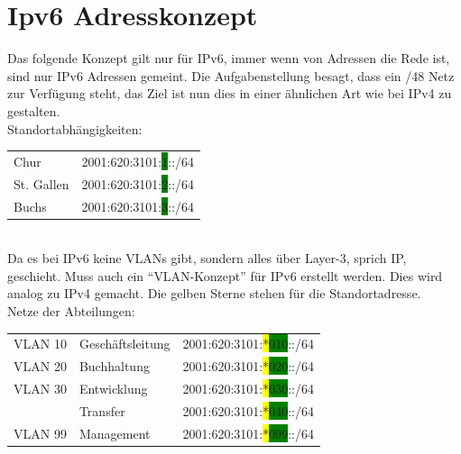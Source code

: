 \documentclass[11pt,a4paper]{scrreprt}
\begin{document}
\section{Ipv6 Adresskonzept} \label{ipv6}
Das folgende Konzept gilt nur für IPv6, immer wenn von Adressen die Rede ist, sind nur IPv6 Adressen gemeint.
Die Aufgabenstellung besagt, dass ein /48 Netz zur Verfügung steht, das Ziel ist nun dies in einer ähnlichen Art wie bei IPv4 zu gestalten. \\
\newline
Standortabhängigkeiten:\\ 
\newline
\hspace*{1cm} 
\begin{tabular}{ll}
    Chur & 2001:620:3101:\colorbox{green}{1}::/64\\
    St. Gallen & 2001:620:3101:\colorbox{green}{2}::/64\\
    Buchs & 2001:620:3101:\colorbox{green}{3}::/64\\
\end{tabular}\\
\newline
Da es bei IPv6 keine \acs{VLAN}s gibt, sondern alles über Layer-3, sprich IP, geschieht. Muss auch ein “\acs{VLAN}-Konzept” für IPv6 erstellt werden. Dies wird analog zu IPv4 gemacht. Die gelben Sterne stehen für die Standortadresse.\\\newline
Netze der Abteilungen: \\
\newline
\hspace*{1cm} 
\begin{tabular}{lll}
     \acs{VLAN} 10 & Geschäftsleitung & 2001:620:3101:\colorbox{yellow}{*}\colorbox{green}{010}::/64\\
     \acs{VLAN} 20 & Buchhaltung & 2001:620:3101:\colorbox{yellow}{*}\colorbox{green}{020}::/64\\
     \acs{VLAN} 30 & Entwicklung & 2001:620:3101:\colorbox{yellow}{*}\colorbox{green}{030}::/64\\
             & Transfer & 2001:620:3101:\colorbox{yellow}{*}\colorbox{green}{040}::/64\\
     \acs{VLAN} 99 & Management & 2001:620:3101:\colorbox{yellow}{*}\colorbox{green}{099}::/64\\
\end{tabular}
\end{document}
